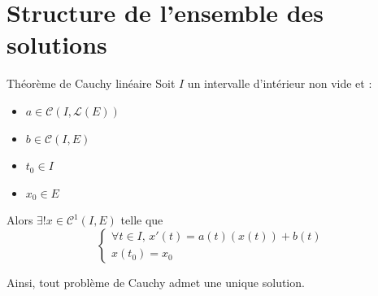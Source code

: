 \section{Structure de l'ensemble des solutions}

\begin{theoreme}{Théorème de Cauchy linéaire}{}
    Soit $I$ un intervalle d'intérieur non vide et : 
    \begin{itemize}
        \item $a \in \mathscr C(I, \mathscr L(E))$
        \item $b \in \mathscr C(I, E)$
        \item $t_0 \in I$
        \item $x_0 \in E$
    \end{itemize}

    Alors $\exists ! x \in \mathscr C^1(I, E)$ telle que 
    $$\begin{cases}
        \forall t \in I, \, x'(t) = a(t)(x(t)) + b(t) \\
        x(t_0) = x_0
    \end{cases}$$

    Ainsi, tout problème de Cauchy admet une unique solution. 
\end{theoreme}



